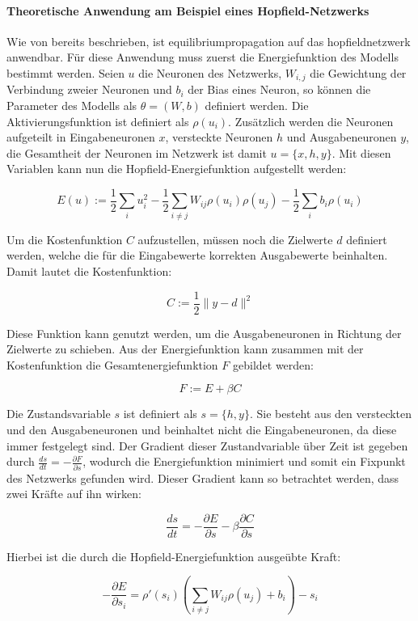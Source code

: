 \paragraph{Theoretische Anwendung am Beispiel eines Hopfield-Netzwerks}

Wie von \cite{Scellier2017} bereits beschrieben, ist \gls{equilibriumpropagation} auf das \gls{hopfieldnetzwerk} anwendbar. Für diese Anwendung muss zuerst die Energiefunktion des Modells bestimmt werden. Seien \(u\) die Neuronen des Netzwerks, \(W_{i,j}\) die Gewichtung der Verbindung zweier Neuronen und \(b_i\) der Bias eines Neuron, so können die Parameter des Modells als \(\theta=(W,b)\) definiert werden. Die Aktivierungsfunktion ist definiert als \(\rho(u_i)\). Zusätzlich werden die Neuronen aufgeteilt in Eingabeneuronen \(x\), versteckte Neuronen \(h\) und Ausgabeneuronen \(y\), die Gesamtheit der Neuronen im Netzwerk ist damit \(u=\{x,h,y\}\). Mit diesen Variablen kann nun die Hopfield-Energiefunktion aufgestellt werden:

\[E(u):=\frac{1}{2}\sum_iu_i^2-\frac{1}{2}\sum_{i\neq{j}}W_{ij}\rho(u_i)\rho(u_j)-\frac{1}{2}\sum_ib_i\rho(u_i)\]

Um die Kostenfunktion \(C\) aufzustellen, müssen noch die Zielwerte \(d\) definiert werden, welche die für die Eingabewerte korrekten Ausgabewerte beinhalten. Damit lautet die Kostenfunktion:

\[C:=\frac{1}{2}\|y-d\|^2\]

Diese Funktion kann genutzt werden, um die Ausgabeneuronen in Richtung der Zielwerte zu schieben. Aus der Energiefunktion kann zusammen mit der Kostenfunktion die Gesamtenergiefunktion \(F\) gebildet werden:

\[F:=E+\beta C\]

Die Zustandsvariable \(s\) ist definiert als \(s=\{h,y\}\). Sie besteht aus den versteckten und den Ausgabeneuronen und beinhaltet nicht die Eingabeneuronen, da diese immer festgelegt sind. Der Gradient dieser Zustandvariable über Zeit ist gegeben durch \(\frac{ds}{dt}=-\frac{\partial F}{\partial s}\), wodurch die Energiefunktion minimiert und somit ein Fixpunkt des Netzwerks gefunden wird. Dieser Gradient kann so betrachtet werden, dass zwei Kräfte auf ihn wirken:

\[\frac{ds}{dt}=-\frac{\partial E}{\partial s}-\beta\frac{\partial C}{\partial s}\]

Hierbei ist die durch die Hopfield-Energiefunktion ausgeübte Kraft:

\[-\frac{\partial E}{\partial s_i}=\rho'(s_i)\left(\sum_{i\neq{j}}W_{ij}\rho(u_j)+b_i\right)-s_i\]

